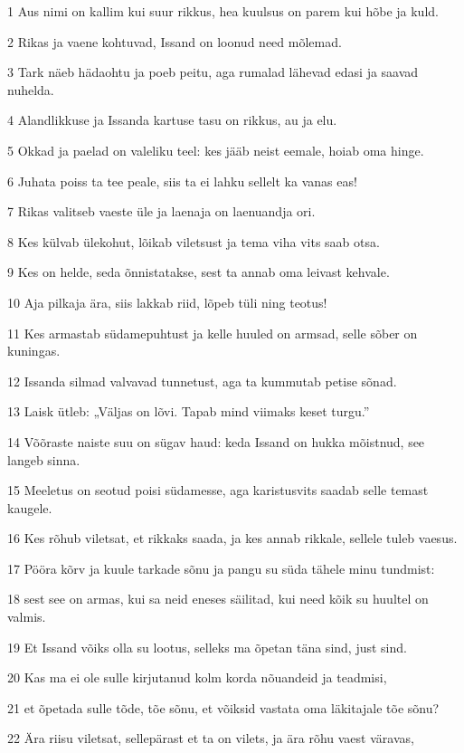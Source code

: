 \par 1 Aus nimi on kallim kui suur rikkus, hea kuulsus on parem kui hõbe ja kuld.
\par 2 Rikas ja vaene kohtuvad, Issand on loonud need mõlemad.
\par 3 Tark näeb hädaohtu ja poeb peitu, aga rumalad lähevad edasi ja saavad nuhelda.
\par 4 Alandlikkuse ja Issanda kartuse tasu on rikkus, au ja elu.
\par 5 Okkad ja paelad on valeliku teel: kes jääb neist eemale, hoiab oma hinge.
\par 6 Juhata poiss ta tee peale, siis ta ei lahku sellelt ka vanas eas!
\par 7 Rikas valitseb vaeste üle ja laenaja on laenuandja ori.
\par 8 Kes külvab ülekohut, lõikab viletsust ja tema viha vits saab otsa.
\par 9 Kes on helde, seda õnnistatakse, sest ta annab oma leivast kehvale.
\par 10 Aja pilkaja ära, siis lakkab riid, lõpeb tüli ning teotus!
\par 11 Kes armastab südamepuhtust ja kelle huuled on armsad, selle sõber on kuningas.
\par 12 Issanda silmad valvavad tunnetust, aga ta kummutab petise sõnad.
\par 13 Laisk ütleb: „Väljas on lõvi. Tapab mind viimaks keset turgu.”
\par 14 Võõraste naiste suu on sügav haud: keda Issand on hukka mõistnud, see langeb sinna.
\par 15 Meeletus on seotud poisi südamesse, aga karistusvits saadab selle temast kaugele.
\par 16 Kes rõhub viletsat, et rikkaks saada, ja kes annab rikkale, sellele tuleb vaesus.
\par 17 Pööra kõrv ja kuule tarkade sõnu ja pangu su süda tähele minu tundmist:
\par 18 sest see on armas, kui sa neid eneses säilitad, kui need kõik su huultel on valmis.
\par 19 Et Issand võiks olla su lootus, selleks ma õpetan täna sind, just sind.
\par 20 Kas ma ei ole sulle kirjutanud kolm korda nõuandeid ja teadmisi,
\par 21 et õpetada sulle tõde, tõe sõnu, et võiksid vastata oma läkitajale tõe sõnu?
\par 22 Ära riisu viletsat, sellepärast et ta on vilets, ja ära rõhu vaest väravas,
